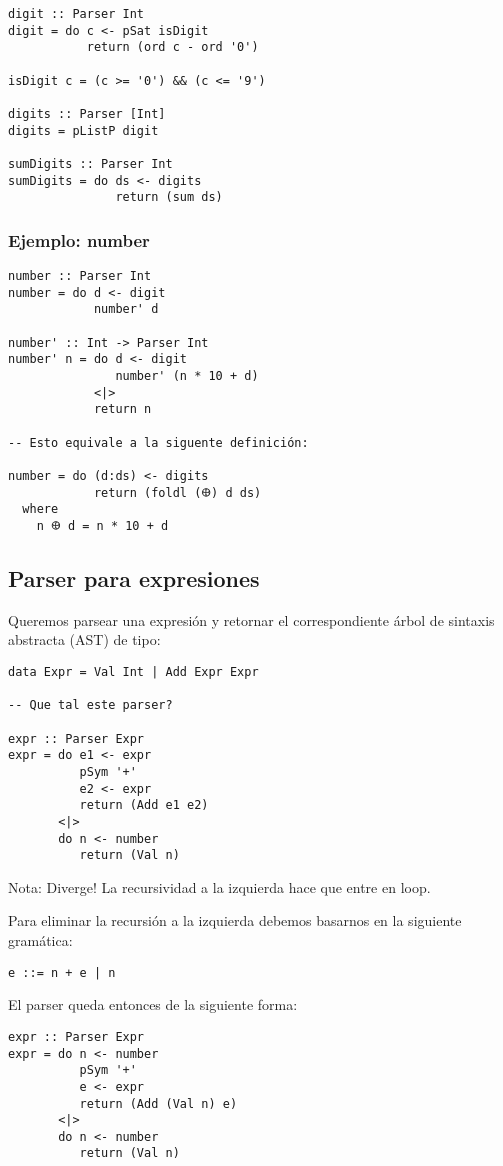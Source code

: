\documentclass{article}
\newcommand{\imp}[1]{\textcolor{color1}{#1}}
\begin{document}
\begin{lstlisting}
digit :: Parser Int
digit = do c <- pSat isDigit
           return (ord c - ord '0')

isDigit c = (c >= '0') && (c <= '9')

digits :: Parser [Int]
digits = pListP digit

sumDigits :: Parser Int
sumDigits = do ds <- digits
               return (sum ds)
\end{lstlisting}

\subsubsection{Ejemplo: number}

\begin{lstlisting}
number :: Parser Int
number = do d <- digit
            number' d

number' :: Int -> Parser Int
number' n = do d <- digit
               number' (n * 10 + d)
            <|>
            return n

-- Esto equivale a la siguente definición:

number = do (d:ds) <- digits
            return (foldl (𐃏) d ds)
  where
    n 𐃏 d = n * 10 + d
\end{lstlisting}

\newpage

\subsection{Parser para expresiones}

Queremos parsear una expresión y retornar el correspondiente árbol
de sintaxis abstracta (AST) de tipo:

\begin{lstlisting}
data Expr = Val Int | Add Expr Expr

-- Que tal este parser?

expr :: Parser Expr
expr = do e1 <- expr
          pSym '+'
          e2 <- expr
          return (Add e1 e2)
       <|>
       do n <- number
          return (Val n)
\end{lstlisting}

\imp{Nota}: Diverge! La recursividad a la izquierda hace que entre en loop.

Para eliminar la recursión a la izquierda debemos basarnos en la
siguiente gramática:
\begin{center}
\texttt{e ::= n + e | n}
\end{center}
\indent \indent El parser queda entonces de la siguiente forma:
\begin{lstlisting}
expr :: Parser Expr
expr = do n <- number
          pSym '+'
          e <- expr
          return (Add (Val n) e)
       <|>
       do n <- number
          return (Val n)
\end{lstlisting}
\end{document}
